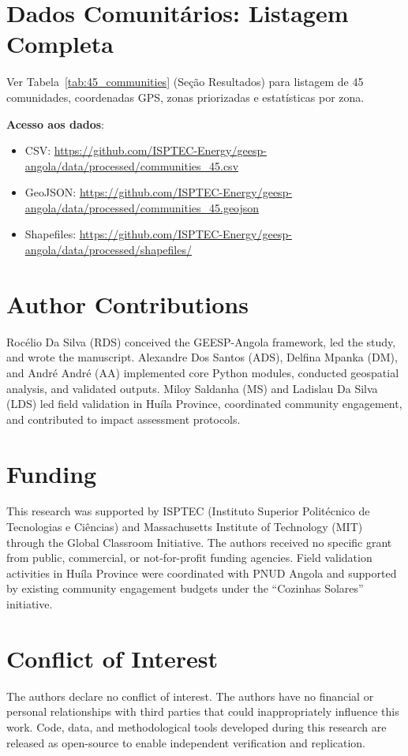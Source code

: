 \documentclass[12pt, a4paper]{article}
\begin{document}
\begin{itemize}
\section{Dados Comunitários: Listagem Completa}
\label{app:community_data}

Ver Tabela~\ref{tab:45_communities} (Seção Resultados) para listagem de 45 comunidades, coordenadas GPS, zonas priorizadas e estatísticas por zona.

\textbf{Acesso aos dados}:
\begin{itemize}
\item CSV: \url{https://github.com/ISPTEC-Energy/geesp-angola/data/processed/communities_45.csv}
\item GeoJSON: \url{https://github.com/ISPTEC-Energy/geesp-angola/data/processed/communities_45.geojson}
\item Shapefiles: \url{https://github.com/ISPTEC-Energy/geesp-angola/data/processed/shapefiles/}
\end{itemize}

\section*{Author Contributions}
Rocélio Da Silva (RDS) conceived the GEESP-Angola framework, led the study, and wrote the manuscript. Alexandre Dos Santos (ADS), Delfina Mpanka (DM), and André André (AA) implemented core Python modules, conducted geospatial analysis, and validated outputs. Miloy Saldanha (MS) and Ladislau Da Silva (LDS) led field validation in Huíla Province, coordinated community engagement, and contributed to impact assessment protocols.

\section*{Funding}
This research was supported by ISPTEC (Instituto Superior Politécnico de Tecnologias e Ciências) and Massachusetts Institute of Technology (MIT) through the Global Classroom Initiative. The authors received no specific grant from public, commercial, or not-for-profit funding agencies. Field validation activities in Huíla Province were coordinated with PNUD Angola and supported by existing community engagement budgets under the ``Cozinhas Solares'' initiative.

\section*{Conflict of Interest}
The authors declare no conflict of interest. The authors have no financial or personal relationships with third parties that could inappropriately influence this work. Code, data, and methodological tools developed during this research are released as open-source to enable independent verification and replication.


\end{itemize}
\end{document}
